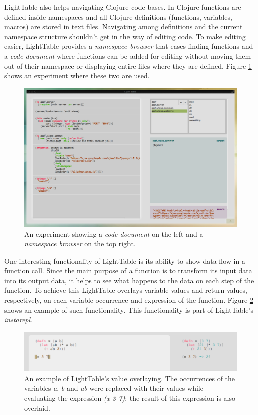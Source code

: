 \documentclass{./llncs2e/llncs}
\begin{document}
	LightTable also helps navigating Clojure code bases.
	In Clojure functions are defined inside namespaces and all Clojure definitions (functions, variables, macros) are stored in text files. 
	Navigating among definitions and the current namespace structure shouldn't get in the way of editing code. 
	To make editing easier, LightTable provides a \emph{namespace browser} that eases finding functions and a \emph{code document} where functions can be added for editing without moving them out of their namespace or displaying entire files where they are defined. 
	Figure \ref{fig:lt:clojure:table} shows an experiment where these two are used.

	\begin{figure}
	  \centering
	  \includegraphics[width=1.0\textwidth]{img/lt_clojure_table__inv}
	    \caption{An experiment showing a \emph{code document} on the left and a \emph{namespace browser} on the top right.}
	  \label{fig:lt:clojure:table}
	\end{figure} 

	One interesting functionality of LightTable is its ability to show data flow in a function call. 
	Since the main purpose of a function is to transform its input data into its output data, it helps to see what happens to the data on each step of the function. 
	To achieve this LightTable overlays variable values and return values, respectively, on each variable occurrence and expression of the function. 
	Figure \ref{fig:lt:val:overlay} shows an example of such functionality. 
	This functionality is part of LightTable's \emph{instarepl}.

	\begin{figure}
		\centering
		\includegraphics[width=1.0\textwidth]{img/lt_val_overlay__inv}
			\caption{An example of LightTable's value overlaying. The occurrences of the variables \emph{a}, \emph{b} and \emph{ab} were replaced with their values while evaluating the expression \emph{(x 3 7)}; the result of this expression is also overlaid.}
		\label{fig:lt:val:overlay}
	\end{figure}
\end{document}
